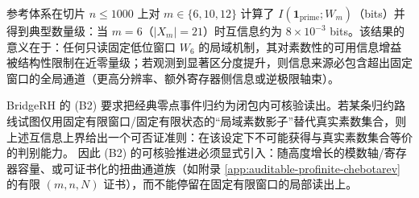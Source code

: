 \begin{remark}\label{rem:prime-shadow-mi-audit-anchor}
参考体系在切片 \(n\le 1000\) 上对 \(m\in\{6,10,12\}\) 计算了 \(I(\mathbf{1}_{\mathrm{prime}};W_m)\)（bits）并得到典型数量级：当 \(m=6\)（\(|X_m|=21\)）时互信息约为 \(8\times 10^{-3}\) bits。该结果的意义在于：任何只读固定低位窗口 \(W_6\) 的局域机制，其对素数性的可用信息增益被结构性限制在近零量级；若观测到显著区分度提升，则信息来源必包含超出固定窗口的全局通道（更高分辨率、额外寄存器侧信息或逆极限轴束）。
\end{remark}

\begin{remark}\label{rem:prime-shadow-to-b2}
BridgeRH 的 (B2) 要求把经典零点事件归约为闭包内可核验读出。若某条归约路线试图仅用固定有限窗口/固定有限状态的“局域素数影子”替代真实素数集合，则上述互信息上界给出一个可否证准则：在该设定下不可能获得与真实素数集合等价的判别能力。
因此 (B2) 的可核验推进必须显式引入：随高度增长的模数轴/寄存器容量、或可证书化的扭曲通道族（如附录 \ref{app:auditable-profinite-chebotarev} 的有限 \((m,n,N)\) 证书），而不能停留在固定有限窗口的局部读出上。
\end{remark}

